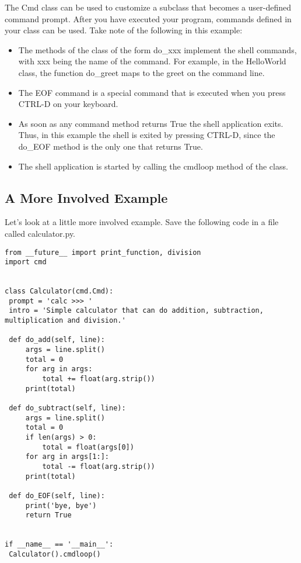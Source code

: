 The Cmd class can be used to customize a subclass that becomes a
user-defined command prompt. After you have executed your program,
commands defined in your class can be used. Take note of the following
in this example:

\begin{itemize}

\item
  The methods of the class of the form do\_xxx implement the shell
  commands, with xxx being the name of the command. For example, in the
  HelloWorld class, the function do\_greet maps to the greet on the
  command line.
\item
  The EOF command is a special command that is executed when you press
  CTRL-D on your keyboard.
\item
  As soon as any command method returns True the shell application
  exits. Thus, in this example the shell is exited by pressing CTRL-D,
  since the do\_EOF method is the only one that returns True.
\item
  The shell application is started by calling the cmdloop method of the
  class.
\end{itemize}

\subsection{A More Involved Example}\label{a-more-involved-example}

Let's look at a little more involved example. Save the following code in
a file called calculator.py.

\begin{lstlisting}
from __future__ import print_function, division
import cmd


class Calculator(cmd.Cmd):
 prompt = 'calc >>> '
 intro = 'Simple calculator that can do addition, subtraction, multiplication and division.'

 def do_add(self, line):
     args = line.split()
     total = 0
     for arg in args:
         total += float(arg.strip())
     print(total)

 def do_subtract(self, line):
     args = line.split()
     total = 0
     if len(args) > 0:
         total = float(args[0])
     for arg in args[1:]:
         total -= float(arg.strip())
     print(total)

 def do_EOF(self, line):
     print('bye, bye')
     return True


if __name__ == '__main__':
 Calculator().cmdloop()
\end{lstlisting}

